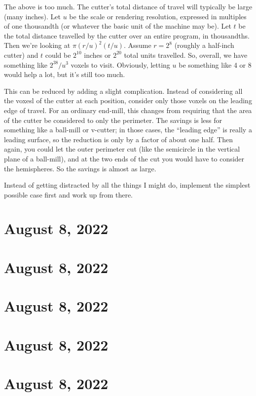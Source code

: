 \documentclass{article}
\begin{document}
The above is too much. The cutter's total distance of travel will
typically be large (many inches). Let $u$ be the scale or rendering
resolution, expressed in multiples of one thousandth (or whatever the
basic unit of the machine may be). Let $t$ be the total distance
travelled by the cutter over an entire program, in thousandths. Then
we're looking at $\pi (r/u)^2 (t/u)$. Assume $r=2^8$ (roughly a
half-inch cutter) and $t$ could be $2^{10}$ inches or $2^{20}$ total
units travelled. So, overall, we have something like $2^{38}/u^3$
voxels to visit. Obviously, letting $u$ be something like 4 or 8 would
help a lot, but it's still too much.

This can be reduced by adding a slight complication. Instead
of considering all the voxesl of the cutter at each position, consider
only those voxels on the leading edge of travel. For an ordinary
end-mill, this changes from requiring that the area of the cutter be
considered to only the perimeter. The savings is less for something
like a ball-mill or v-cutter; in those cases, the ``leading edge'' is
really a leading surface, so the reduction is only by a factor of
about one half. Then again, you could let the outer perimeter cut
(like the semicircle in the vertical plane of a ball-mill), and at the
two ends of the cut you would have to consider the hemispheres. So the
savings is almost as large.

Instead of getting distracted by all the things I might do, implement
the simplest possible case first and work up from there.

\section{August 8, 2022}
\section{August 8, 2022}
\section{August 8, 2022}
\section{August 8, 2022}
\section{August 8, 2022}
\end{document}

